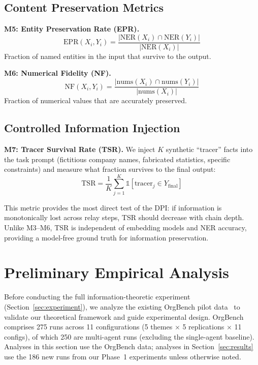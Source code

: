 \documentclass[conference]{IEEEtran}
\begin{document}
\subsection{Content Preservation Metrics}

\textbf{M5: Entity Preservation Rate (EPR).}
\begin{equation}
    \text{EPR}(X_i, Y_i) = \frac{|\text{NER}(X_i) \cap \text{NER}(Y_i)|}{|\text{NER}(X_i)|}
\end{equation}
Fraction of named entities in the input that survive to the output.


\textbf{M6: Numerical Fidelity (NF).}
\begin{equation}
    \text{NF}(X_i, Y_i) = \frac{|\text{nums}(X_i) \cap \text{nums}(Y_i)|}{|\text{nums}(X_i)|}
\end{equation}
Fraction of numerical values that are accurately preserved.


\subsection{Controlled Information Injection}

\textbf{M7: Tracer Survival Rate (TSR).}
We inject $K$ synthetic ``tracer'' facts into the task prompt (fictitious company names, fabricated statistics, specific constraints) and measure what fraction survives to the final output:
\begin{equation}
    \text{TSR} = \frac{1}{K} \sum_{j=1}^{K} \mathbb{1}[\text{tracer}_j \in Y_{\text{final}}]
\end{equation}


This metric provides the most direct test of the DPI: if information is monotonically lost across relay steps, TSR should decrease with chain depth.
Unlike M3--M6, TSR is independent of embedding models and NER accuracy, providing a model-free ground truth for information preservation.


\section{Preliminary Empirical Analysis}
\label{sec:preliminary}

Before conducting the full information-theoretic experiment (Section~\ref{sec:experiment}), we analyze the existing OrgBench pilot data~\cite{shinoda2026orgbench} to validate our theoretical framework and guide experimental design.
OrgBench comprises 275 runs across 11 configurations (5 themes $\times$ 5 replications $\times$ 11 configs), of which 250 are multi-agent runs (excluding the single-agent baseline).
Analyses in this section use the OrgBench data; analyses in Section~\ref{sec:results} use the 186 new runs from our Phase~1 experiments unless otherwise noted.
\end{document}
